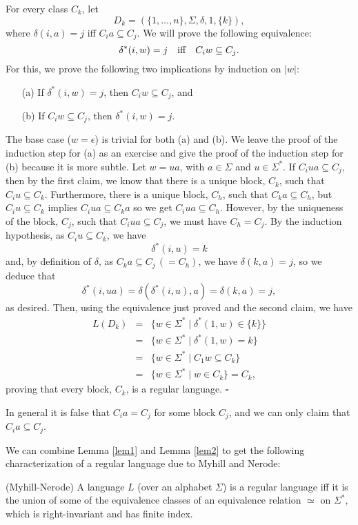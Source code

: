 \medskip
For every class $C_k$, let
$$D_k = (\{1,\ldots, n\}, \Sigma, \delta, 1, \{k\}),$$
where $\delta(i, a) = j$ iff $C_i a\subseteq C_j$.
We will prove the following equivalence:
\[
\delta^*(i, w) = j\quad\hbox{iff}\quad
C_iw \subseteq C_j.
\]
For this, we prove the following two implications
by induction on $|w|$:
\begin{enumerate}
\item[(a)]
If $\delta^*(i, w) = j$, then $C_iw \subseteq C_j$, and
\item[(b)]
If  $C_iw \subseteq C_j$, then $\delta^*(i, w) = j$.
\end{enumerate}
The base case ($w = \epsilon$) is trivial for both (a) and (b).
We leave the proof of the induction step for (a) as an exercise and 
give the proof of the  induction step for (b) because it is more subtle.
Let $w = ua$, with $a\in \Sigma$  and $u\in \Sigma^*$.
If $C_iua \subseteq C_j$, then by the first claim, we know that
there is a unique block, $C_k$, such that $C_iu \subseteq C_k$.
Furthermore, there is a unique block, $C_h$, such that
$C_ka \subseteq C_h$, but $C_iu \subseteq C_k$ implies
$C_iua \subseteq C_ka$ so we get $C_iua \subseteq C_h$. However,
by the uniqueness of the block, $C_j$, such  that $C_iua \subseteq C_j$,
we must have $C_h = C_j$. By the induction hypothesis, as
$C_iu \subseteq C_k$, we have
\[
\delta^*(i, u) = k 
\]
and, by definition of $\delta$, as $C_ka \subseteq C_j\, (= C_h)$,
we have 
$\delta(k, a) = j$,
so we deduce that
\[
\delta^*(i, ua) = \delta(\delta^*(i, u), a) = \delta(k, a) = j,
\]
as desired.
Then, using the equivalence just proved  and the second claim, we have
\begin{eqnarray*}
L(D_k)  & = & \{w\in \Sigma^* \mid \delta^*(1, w) \in \{k\}\} \\
  & = & \{w\in \Sigma^* \mid \delta^*(1, w)  = k\} \\
  & = & \{w\in \Sigma^* \mid C_1 w  \subseteq C_k\} \\
  & = & \{w\in \Sigma^* \mid w\in C_k\} = C_k,
\end{eqnarray*}
proving that every block, $C_k$, is a regular language.
$\square$

\medskip
\danger
In general it is false that $C_i a = C_j$ for some block
$C_j$, and we can only claim that $C_i a \subseteq C_j$.

\medskip
We can combine Lemma \ref{lem1} and Lemma \ref{lem2}
to get the following characterization of a regular language
due to Myhill and Nerode:

\begin{thm} (Myhill-Nerode)
\label{myne}
A language $L$ (over an alphabet $\Sigma$) is a regular
language iff it is the union of some of the equivalence
classes of an equivalence relation $\simeq$ on $\Sigma^*$,
which is right-invariant and has finite index.
\end{thm}

